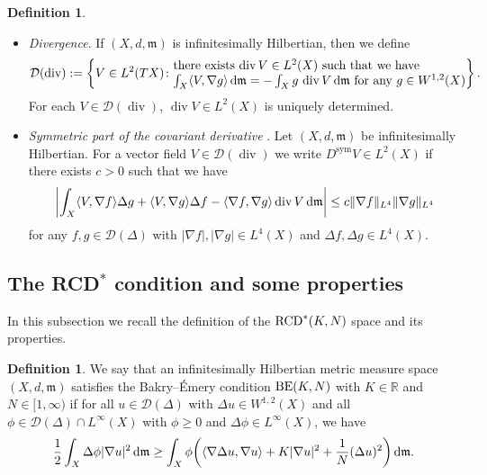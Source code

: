 \documentclass[10pt,a4paper]{amsart}
\numberwithin{equation}{section}
\theoremstyle{definition}
\newtheorem{Def}[Thm]{Definition}
\newcommand{\sym}{\operatorname{sym}}
\newcommand{\R}{\mathbb{R}}
\newcommand{\mf}{\mathfrak{m}}
\newcommand{\Div}{\operatorname{div}}
\newcommand{\RCD}{{\rm RCD}^\ast}
\newcommand{\BE}{{\rm BE}}
\newcommand{\D}{\mathcal{D}}
\begin{document}
\begin{Def}
\begin{itemize}
\item \emph{Divergence}. If $(X,d,\mf)$ is infinitesimally Hilbertian, then we define
\[
\D(\Div):=\left\{V\in L^{2}(T X)\colon \begin{array}{@{}l@{}}\text{there exists $\Div V \in L^2(X)$ such that we have}\\
\text{$\int_X \langle V, \nabla g\rangle\, {\rm d}\mf=-\int_X g\, \Div V \,{\rm d}\mf$ for any $g\in W^{1,2}(X)$}\end{array}  \right\} .
\]
For each $V\in\D(\Div)$, $\Div V\in L^2(X)$ is uniquely determined.
\item \emph{Symmetric part of the covariant derivative} \cite[Definition~5.4]{AT2}. Let $(X,d,\mf)$ be infinitesimally Hilbertian.
For a vector field $V\in \D(\Div)$ we write $D^{\sym} V\in L^2(X)$ if there exists $c>0$ such that we have
\begin{gather}\label{symd}
\left|\int_X \langle V,\nabla f\rangle \Delta g+ \langle V,\nabla g\rangle\Delta f -\langle\nabla f,\nabla g\rangle\Div V\,{\rm d}\mf\right|\leq c \|\nabla f\|_{L^4}\|\nabla g\|_{L^4}
\end{gather}
for any $f,g\in \D(\Delta)$ with $|\nabla f|,|\nabla g|\in L^4(X)$ and $\Delta f,\Delta g\in L^4(X)$.
\end{itemize}

\end{Def}
\subsection[The RCD* condition and some properties]{The RCD$^{\boldsymbol *}$ condition and some properties}
In this subsection we recall the definition of the $\RCD(K,N)$ space and its properties.
\begin{Def}
We say that an infinitesimally Hilbertian metric measure space $(X,d,\mf)$ satisfies the Bakry--\'{E}mery condition $\BE(K,N)$ with $K\in\R$ and $N\in [1,\infty)$ if for all $u\in\D(\Delta)$ with $\Delta u\in W^{1,2}(X)$ and all $\phi\in\D(\Delta)\cap L^\infty(X)$ with $\phi\geq0$ and $\Delta \phi\in L^\infty(X)$, we have
\begin{gather*}
\frac{1}{2}\int_{X}\Delta \phi|\nabla u|^2 \,{\rm d}\mf\geq \int_{X} \phi\bigg(\langle\nabla \Delta u,\nabla u\rangle+K|\nabla u|^2+\frac{1}{N}(\Delta u)^2\bigg) \,{\rm d}\mf.
\end{gather*}
\end{Def}
\end{document}
